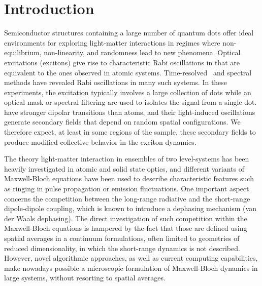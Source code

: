 \section{\label{sec:introduction}Introduction}
Semiconductor structures containing a large number of quantum dots offer ideal environments for exploring light-matter interactions in regimes where non-equilibrium, non-linearity, and randomness lead to new phenomena.
Optical excitations (excitons) give rise to characteristic Rabi oscillations in \qds{} that are equivalent to the ones observed in atomic systems.
Time-resolved~\cite{stievater,shih} and spectral~\cite{kamada} methods have revealed Rabi oscillations in many such systems.
In these experiments, the excitation typically involves a large collection of dots while an optical mask or spectral filtering are used to isolates the signal from a single dot. 
\Qds{} have stronger dipolar transitions than atoms, and their light-induced oscillations generate  secondary fields that depend on random spatial configurations. We therefore expect, at least in some regions of the sample, these secondary fields to produce modified collective behavior in the exciton dynamics.

The theory light-matter interaction in ensembles of two level-systems has been heavily investigated in atomic and solid state optics, and different variants of Maxwell-Bloch equations\cite{Gross1982} have been used to describe characteristic features such as ringing in pulse propagation\cite{Burnham-Chiao PR 188 667 1969,MacGillivray1976} or emission fluctuations\cite{Haake1979}. One important aspect concerns the competition between the long-range radiative and the short-range dipole-dipole coupling\cite{coffey1978}, which is known to introduce a dephasing mechanism (van der Waals dephasing\cite{gross1982}). The direct investigation of such competition within the Maxwell-Bloch equations is hampered by the fact that those are defined using spatial averages in a continuum formulations, often limited to geometries of reduced dimensionality, in which the short-range dynamics is not described. However, novel algorithmic approaches, as well as current computing capabilities, make nowadays possible a microscopic formulation of Maxwell-Bloch dynamics in large systems, without resorting to spatial averages.

